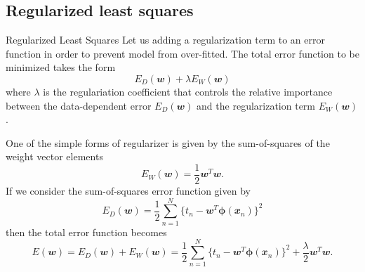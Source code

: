 \documentclass{bredelebeamer}
\begin{document}
\subsection{Regularized least squares}
\begin{frame}{Regularized Least Squares}
  Let us adding a regularization term to an error function in order to prevent
  model from over-fitted. The total error function to be minimized takes the form
  \begin{equation}
    E_{D}(\mathbfit{w}) + \lambda E_{W}(\mathbfit{w})
  \end{equation}
  where $\lambda$ is the regulariation coefficient that controls the relative
  importance between the data-dependent error $E_{D}(\mathbfit{w})$ and the
  regularization term $E_{W} (\mathbfit{w})$.

  \vspace{1.0\baselineskip}
  One of the simple forms of regularizer is given by the sum-of-squares of the
  weight vector elements
  \begin{equation}
    E_{W} (\mathbfit{w}) = \frac{1}{2} \mathbfit{w}^T \mathbfit{w}.
  \end{equation}
  If we consider the sum-of-squares error function given by
  \begin{equation}
    E_{D} (\mathbfit{w}) = \frac{1}{2} \sum_{n=1}^N {\{t_n-\mathbfit{w}^T \boldsymbol{\phi} (\mathbfit{x}_n)\}}^2
  \end{equation}
  then the total error function becomes
  \begin{equation}
    E(\mathbfit{w}) = E_{D} (\mathbfit{w}) + E_{W} (\mathbfit{w})
     = \frac{1}{2} \sum_{n=1}^N {\{t_n-\mathbfit{w}^T \boldsymbol{\phi} (\mathbfit{x}_n)\}}^2
     + \frac{\lambda}{2} \mathbfit{w}^T \mathbfit{w}.
  \end{equation}
\end{frame}
\end{document}
